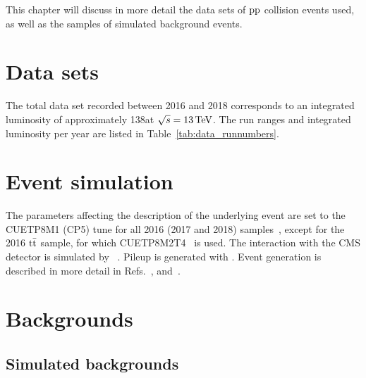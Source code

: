 
 \label{sec:samples}

This chapter will discuss in more detail the data sets of $\mathrm{p}\mathrm{p}$ collision events used, as well as the samples of simulated background events.


\section{Data sets} \label{sec:data}

The total data set recorded between 2016 and 2018 corresponds to an integrated luminosity of approximately 138\fbinv at $\sqrt{s}=13{\,\text{Te\hspace{-.08em}V}}$. The run ranges and integrated luminosity per year are listed in Table~\ref{tab:data_runnumbers}.






\section{Event simulation} \label{sec:simulation}

The \PYTHIA parameters affecting the description of the underlying event are set to the {CUETP8M1} ({CP5}) tune for all 2016 (2017 and 2018) samples~\cite{TuneCUETP8M1,TuneCP}, except for the 2016 ${{\text{t}}{\bar{\text{t}}}}$ sample, for which {CUETP8M2T4}~\cite{TuneCUETP8M2T4} is used.
The interaction with the CMS detector is simulated by \GEANTfour~\cite{GEANT4}.
Pileup is generated with \PYTHIA.
Event generation is described in more detail in Refs.~\cite[p.~717]{PDG_2022}, \cite{event_generation} and~\cite{Pythia6_manual}.


\section{Backgrounds} \label{sec:background}



\subsection{Simulated backgrounds} \label{sec:background_simulation}

